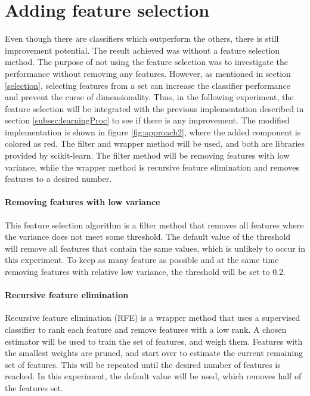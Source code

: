 \documentclass[USenglish]{ifimaster}  %
\begin{document}
	
	
	
\section{Adding feature selection}
Even though there are classifiers which outperform the others, there is still improvement potential. The result achieved was without a feature selection method. The purpose of not using the feature selection was to investigate the performance without removing any features. However, as mentioned in section \ref{selection}, selecting features from a set can increase the classifier performance and prevent the curse of dimensionality. Thus, in the following experiment, the feature selection will be integrated with the previous implementation described in section \ref{subsec:learningProc} to see if there is any improvement. The modified implementation is shown in figure \ref{fig:approach2}, where the added component is colored as red. The filter and wrapper method will be used, and both are libraries provided by scikit-learn. The filter method will be removing features with low variance, while the wrapper method is recursive feature elimination and removes features to a desired number. 

\paragraph{Removing features with low variance} \label{ap:variance}
This feature selection algorithm is a filter method that removes all features where the variance does not meet some threshold. The default value of the threshold will remove all features that contain the same values, which is unlikely to occur in this experiment. To keep as many feature as possible and at the same time removing features with relative low variance, the threshold will be set to 0.2.

\paragraph{Recursive feature elimination} \label{ap:rfe}
Recursive feature elimination (RFE) is a wrapper method that uses a supervised classifier to rank each feature and remove features with a low rank. A chosen estimator will be used to train the set of features, and weigh them. Features with the smallest weights are pruned, and start over to estimate the current remaining set of features. This will be repeated until the desired number of features is reached. In this experiment, the default value will be used, which removes half of the features set.
\end{document}
